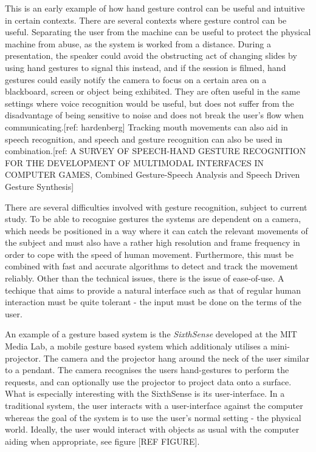 This is an early example of how hand gesture control can be useful and intuitive in certain contexts. There are several contexts where gesture control can be useful. Separating the user from the machine can be useful to protect the physical machine from abuse, as the system is worked from a distance. During a presentation, the speaker could avoid the obstructing act of changing slides by using hand gestures to signal this instead, and if the session is filmed, hand gestures could easily notify the camera to focus on a certain area on a blackboard, screen or object being exhibited. They are often useful in the same settings where voice recognition would be useful, but does not suffer from the disadvantage of being sensitive to noise and does not break the user's flow when communicating.[ref: hardenberg] Tracking mouth movements can also aid in speech recognition, and speech and gesture recognition can also be used in combination.[ref: A SURVEY OF SPEECH-HAND GESTURE RECOGNITION FOR THE DEVELOPMENT OF
MULTIMODAL INTERFACES IN COMPUTER GAMES, Combined Gesture-Speech Analysis and Speech Driven Gesture Synthesis]

There are several difficulties involved with gesture recognition, subject to current study. To be able to recognise gestures the systems are dependent on a camera, which needs be positioned in a way where it can catch the relevant movements of the subject and must also have a rather high resolution and frame frequency in order to cope with the speed of human movement. Furthermore, this must be combined with fast and accurate algorithms to detect and track the movement reliably. Other than the technical issues, there is the issue of ease-of-use. A techique that aims to provide a natural interface such as that of regular human interaction must be quite tolerant - the input must be done on the terms of the user. 

An example of a gesture based system is the \emph{SixthSense} developed at the MIT Media Lab, a mobile gesture based system which additionaly utilises a mini-projector. The camera and the projector hang around the neck of the user similar to a pendant. The camera recognises the users hand-gestures to perform the requests, and can optionally use the projector to project data onto a surface. What is especially interesting with the SixthSense is its user-interface. In a traditional system, the user interacts with a user-interface against the computer whereas the goal of the system is to use the user's normal setting - the physical world. Ideally, the user would interact with objects as usual with the computer aiding when appropriate, see figure [REF FIGURE].


